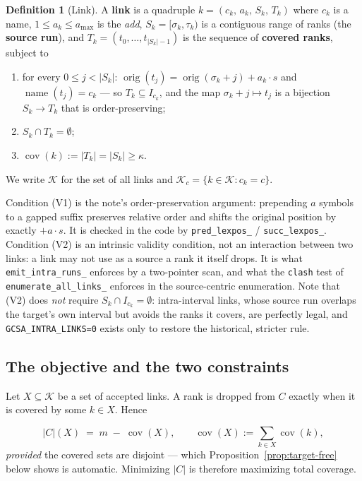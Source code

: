 \documentclass[11pt,a4paper]{article}
\theoremstyle{definition}
\newtheorem{definition}{Definition}
\theoremstyle{plain}
\theoremstyle{remark}
\newcommand{\cov}{\operatorname{cov}}
\newcommand{\orig}{\operatorname{orig}}
\newcommand{\name}{\operatorname{name}}
\newcommand{\Links}{\mathcal{K}}
\begin{document}
\begin{definition}[Link]
\label{def:link}
A \textbf{link} is a quadruple $k = (c_k,\, a_k,\, S_k,\, T_k)$ where
$c_k$ is a name, $1 \le a_k \le a_{\max}$ is the \emph{add},
$S_k = [\sigma_k, \tau_k)$ is a contiguous range of ranks (the
\textbf{source run}), and
$T_k = (t_0,\dots,t_{|S_k|-1})$ is the sequence of \textbf{covered ranks},
subject to
\begin{enumerate}
\item[(V1)] for every $0 \le j < |S_k|$:
  $\orig(t_j) = \orig(\sigma_k + j) + a_k\cdot s$ and $\name(t_j) = c_k$
  --- so $T_k \subseteq I_{c_k}$, and the map $\sigma_k+j \mapsto t_j$ is
  a bijection $S_k \to T_k$ that is order-preserving;
\item[(V2)] $S_k \cap T_k = \emptyset$;
\item[(V3)] $\cov(k) := |T_k| = |S_k| \ge \kappa$.
\end{enumerate}
We write $\Links$ for the set of all links and
$\Links_c = \{k \in \Links : c_k = c\}$.
\end{definition}

Condition (V1) is the note's order-preservation argument: prepending
$a$ symbols to a gapped suffix preserves relative order and shifts the
original position by exactly $+a\cdot s$. It is checked in the code by
\texttt{pred\_lexpos\_} / \texttt{succ\_lexpos\_}. Condition (V2) is an
intrinsic validity condition, not an interaction between two links: a
link may not use as a source a rank it itself drops. It is what
\texttt{emit\_intra\_runs\_} enforces by a two-pointer scan, and what the
\texttt{clash} test of \texttt{enumerate\_all\_links\_} enforces in the
source-centric enumeration. Note that (V2) does \emph{not} require
$S_k \cap I_{c_k} = \emptyset$: intra-interval links, whose source run
overlaps the target's own interval but avoids the ranks it covers, are
perfectly legal, and \texttt{GCSA\_INTRA\_LINKS=0} exists only to restore
the historical, stricter rule.

\subsection{The objective and the two constraints}

Let $X \subseteq \Links$ be a set of accepted links. A rank is dropped
from $C$ exactly when it is covered by some $k \in X$. Hence

\begin{equation}
\label{eq:objective}
  |C|(X) \;=\; m \;-\; \cov(X),
  \qquad
  \cov(X) := \sum_{k \in X} \cov(k),
\end{equation}
\emph{provided} the covered sets are disjoint --- which
Proposition~\ref{prop:target-free} below shows is automatic. Minimizing
$|C|$ is therefore maximizing total coverage.
\end{document}
